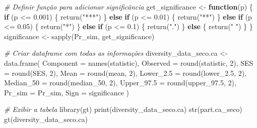 \documentclass[
  letterpaper,
  DIV=11,
  numbers=noendperiod]{scrartcl}
\newenvironment{Shaded}{}{}
\newcommand{\AttributeTok}[1]{\textcolor[rgb]{0.49,0.56,0.16}{#1}}
\newcommand{\CommentTok}[1]{\textcolor[rgb]{0.38,0.63,0.69}{\textit{#1}}}
\newcommand{\ControlFlowTok}[1]{\textcolor[rgb]{0.00,0.44,0.13}{\textbf{#1}}}
\newcommand{\DecValTok}[1]{\textcolor[rgb]{0.25,0.63,0.44}{#1}}
\newcommand{\FloatTok}[1]{\textcolor[rgb]{0.25,0.63,0.44}{#1}}
\newcommand{\FunctionTok}[1]{\textcolor[rgb]{0.02,0.16,0.49}{#1}}
\newcommand{\NormalTok}[1]{#1}
\newcommand{\OtherTok}[1]{\textcolor[rgb]{0.00,0.44,0.13}{#1}}
\newcommand{\SpecialCharTok}[1]{\textcolor[rgb]{0.25,0.44,0.63}{#1}}
\newcommand{\StringTok}[1]{\textcolor[rgb]{0.25,0.44,0.63}{#1}}
\begin{document}
\begin{Shaded}
\begin{Highlighting}[numbers=left,,]
\CommentTok{\# Definir função para adicionar significância}
\NormalTok{get\_significance }\OtherTok{\textless{}{-}} \ControlFlowTok{function}\NormalTok{(p) \{}
  \ControlFlowTok{if}\NormalTok{ (p }\SpecialCharTok{\textless{}=} \FloatTok{0.001}\NormalTok{) \{}
    \FunctionTok{return}\NormalTok{(}\StringTok{"***"}\NormalTok{)}
\NormalTok{  \} }\ControlFlowTok{else} \ControlFlowTok{if}\NormalTok{ (p }\SpecialCharTok{\textless{}=} \FloatTok{0.01}\NormalTok{) \{}
    \FunctionTok{return}\NormalTok{(}\StringTok{"**"}\NormalTok{)}
\NormalTok{  \} }\ControlFlowTok{else} \ControlFlowTok{if}\NormalTok{ (p }\SpecialCharTok{\textless{}=} \FloatTok{0.05}\NormalTok{) \{}
    \FunctionTok{return}\NormalTok{(}\StringTok{"*"}\NormalTok{)}
\NormalTok{  \} }\ControlFlowTok{else} \ControlFlowTok{if}\NormalTok{ (p }\SpecialCharTok{\textless{}=} \FloatTok{0.1}\NormalTok{) \{}
    \FunctionTok{return}\NormalTok{(}\StringTok{"."}\NormalTok{)}
\NormalTok{  \} }\ControlFlowTok{else}\NormalTok{ \{}
    \FunctionTok{return}\NormalTok{(}\StringTok{" "}\NormalTok{)}
\NormalTok{  \}}
\NormalTok{\}}
\NormalTok{significance }\OtherTok{\textless{}{-}} \FunctionTok{sapply}\NormalTok{(Pr\_sim, get\_significance)}

\CommentTok{\# Criar dataframe com todas as informações}
\NormalTok{diversity\_data\_seco.ca }\OtherTok{\textless{}{-}} \FunctionTok{data.frame}\NormalTok{(}
  \AttributeTok{Component =} \FunctionTok{names}\NormalTok{(statistic),}
  \AttributeTok{Observed =} \FunctionTok{round}\NormalTok{(statistic, }\DecValTok{2}\NormalTok{),}
  \AttributeTok{SES =} \FunctionTok{round}\NormalTok{(SES, }\DecValTok{2}\NormalTok{),}
  \AttributeTok{Mean =} \FunctionTok{round}\NormalTok{(mean, }\DecValTok{2}\NormalTok{),}
  \AttributeTok{Lower\_2.5 =} \FunctionTok{round}\NormalTok{(lower\_2}\FloatTok{.5}\NormalTok{, }\DecValTok{2}\NormalTok{),}
  \AttributeTok{Median\_50 =} \FunctionTok{round}\NormalTok{(median\_50, }\DecValTok{2}\NormalTok{),}
  \AttributeTok{Upper\_97.5 =} \FunctionTok{round}\NormalTok{(upper\_97}\FloatTok{.5}\NormalTok{, }\DecValTok{2}\NormalTok{),}
  \AttributeTok{Pr\_sim =}\NormalTok{ Pr\_sim,}
  \AttributeTok{Sign =}\NormalTok{ significance}
\NormalTok{)}

\CommentTok{\# Exibir a tabela}
\FunctionTok{library}\NormalTok{(gt)}
\FunctionTok{print}\NormalTok{(diversity\_data\_seco.ca)}
\FunctionTok{str}\NormalTok{(part.ca\_seco)}
\FunctionTok{gt}\NormalTok{(diversity\_data\_seco.ca)}


\end{Highlighting}
\end{Shaded}
\end{document}
